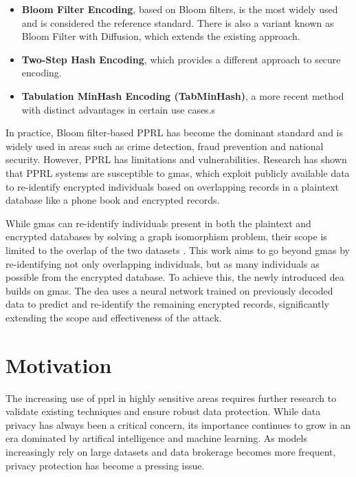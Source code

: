 \begin{itemize}
    \item \textbf{Bloom Filter Encoding},  based on Bloom filters, is the most widely used and is considered the reference standard. There is also a variant known as Bloom Filter with Diffusion, which extends the existing approach.
    \item \textbf{Two-Step Hash Encoding}, which provides a different approach to secure encoding. %
    \item \textbf{Tabulation MinHash Encoding (TabMinHash)}, a more recent method with distinct advantages in certain use cases.s %
\end{itemize}

In practice, Bloom filter-based PPRL has become the dominant standard and is widely used in areas such as crime detection, fraud prevention and national security. However, PPRL has limitations and vulnerabilities. Research has shown that PPRL systems are susceptible to \ac{gma}s, which exploit publicly available data to re-identify encrypted individuals based on overlapping records in a plaintext database like a phone book and encrypted records. \cite{pathak2024, schaefer2024}

While \ac{gma}s can re-identify individuals present in both the plaintext and encrypted databases by solving a graph isomorphism problem, their scope is limited to the overlap of the two datasets \cite{schaefer2024}. This work aims to go beyond \ac{gma}s by re-identifying not only overlapping individuals, but as many individuals as possible from the encrypted database. To achieve this, the newly introduced \ac{dea} builds on \ac{gma}s. The \ac{dea} uses a neural network trained on previously decoded data to predict and re-identify the remaining encrypted records, significantly extending the scope and effectiveness of the attack. 


\section{Motivation}  \label{sec:motivation}
The increasing use of \ac{pprl} in highly sensitive areas requires further research to validate existing techniques and ensure robust data protection. While data privacy has always been a critical concern, its importance continues to grow in an era dominated by artifical intelligence and machine learning. As models increasingly rely on large datasets and data brokerage becomes more frequent, privacy protection has become a pressing issue.


